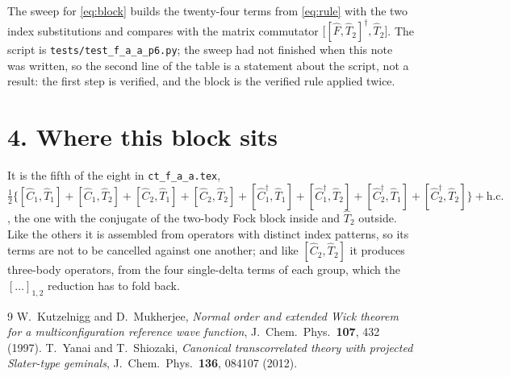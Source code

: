 \documentclass[11pt]{article}
\newcommand{\hc}{\mathrm{h.c.}}
\begin{document}
\noindent
The sweep for \eqref{eq:block} builds the twenty-four terms from
\eqref{eq:rule} with the two index substitutions and compares with the matrix
commutator $\bigl[[\hat F,\hat T_2]^\dagger,\hat T_2\bigr]$. The script is
\texttt{tests/test\_f\_a\_a\_p6.py}; the sweep had not finished when this note was written, so the
second line of the table is a statement about the script, not a result: the
first step is verified, and the block is the verified rule applied twice.

\section*{4. Where this block sits}

It is the fifth of the eight in \texttt{ct\_f\_a\_a.tex},
$\tfrac12\bigl\{[\hat C_1,\hat T_1]+[\hat C_1,\hat T_2]
+[\hat C_2,\hat T_1]+[\hat C_2,\hat T_2]
+[\hat C_1^\dagger,\hat T_1]+[\hat C_1^\dagger,\hat T_2]
+[\hat C_2^\dagger,\hat T_1]+[\hat C_2^\dagger,\hat T_2]\bigr\}+\hc$,
the one with the conjugate of the two-body Fock block inside and $\hat T_2$
outside. Like the others it is assembled from operators with distinct index
patterns, so its terms are not to be cancelled against one another; and like
$[\hat C_2,\hat T_2]$ it produces three-body operators, from the four
single-delta terms of each group, which the $[\dots]_{1,2}$ reduction has to
fold back.

\begin{thebibliography}{9}
 W.~Kutzelnigg and D.~Mukherjee,
  \emph{Normal order and extended Wick theorem for a multiconfiguration
  reference wave function}, J.~Chem.~Phys.\ \textbf{107}, 432 (1997).
 T.~Yanai and T.~Shiozaki,
  \emph{Canonical transcorrelated theory with projected Slater-type geminals},
  J.~Chem.~Phys.\ \textbf{136}, 084107 (2012).
\end{thebibliography}
\end{document}
